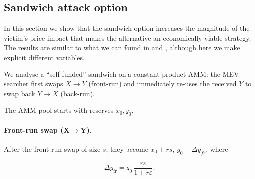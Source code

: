 \documentclass[a4paper,11pt]{article}
\begin{document}





\subsection{Sandwich attack option}
In this section we show that the sandwich option increases the magnitude of the victim's price impact that makes the alternative an economically viable strategy. The results are similar to what we can found in \cite{sea_of_coins} and \cite{heimbach}, although here we make explicit different variables.

We analyse a “self-funded” sandwich on a constant-product AMM: the MEV
searcher first swaps \(X\!\to\!Y\) (front-run) and immediately re-uses
the received \(Y\) to swap back \(Y\!\to\!X\) (back-run). 

The AMM pool starts with reserves $x_0,y_0$. 
\paragraph{Front-run swap (X$\to$Y).}After the front-run swap of size $s$, they become $x_0 + r s,\,y_0-\Delta y_{fr}$, where

\begin{equation}
\Delta y_{\mathrm{fr}}
  =y_0\,\frac{r\varepsilon}{1+r\varepsilon}.
\end{equation}
\end{document}
